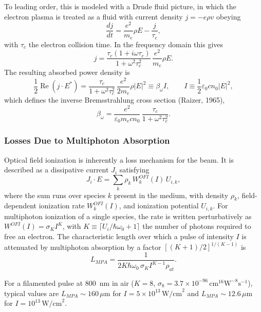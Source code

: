 \documentclass[11pt,a4paper]{article}
\begin{document}
To leading order, this is modeled with a Drude fluid picture, in which the electron plasma is treated as a fluid with current density $j=-e\rho v$ obeying
\begin{equation}
\frac{dj}{dt} = \frac{e^2}{m_e}\rho E - \frac{j}{\tau_c},
\end{equation}
with $\tau_c$ the electron collision time. In the frequency domain this gives
\begin{equation}
j = \frac{\tau_c(1+i\omega\tau_c)}{1+\omega^2\tau_c^2}\,\frac{e^2}{m_e}\rho E.
\end{equation}
The resulting absorbed power density is
\begin{equation}
\frac12\operatorname{Re}(j\cdot E^*) = \frac{\tau_c}{1+\omega^2\tau_c^2}\,\frac{e^2}{2m_e}\rho|E|^2 \equiv \beta_\omega I,
\qquad I\equiv\frac12\varepsilon_0cn_0|E|^2,
\end{equation}
which defines the inverse Bremsstrahlung cross section (Raizer, 1965),
\begin{equation}
\beta_\omega = \frac{e^2}{\varepsilon_0m_ecn_0}\,\frac{\tau_c}{1+\omega^2\tau_c^2}.
\end{equation}

\subsubsection{Losses Due to Multiphoton Absorption}
Optical field ionization is inherently a loss mechanism for the beam. It is described as a dissipative current $J_i$ satisfying
\begin{equation}
J_i\cdot E = \sum_k \rho_k\,W^{OFI}_k(I)\,U_{i,k},
\end{equation}
where the sum runs over species $k$ present in the medium, with density $\rho_k$, field-dependent ionization rate $W^{OFI}_k(I)$, and ionization potential $U_{i,k}$. For multiphoton ionization of a single species, the rate is written perturbatively as $W^{OFI}(I)=\sigma_KI^K$, with $K\equiv\lceil U_i/\hbar\omega_0+1\rceil$ the number of photons required to free an electron. The characteristic length over which a pulse of intensity $I$ is attenuated by multiphoton absorption by a factor $[(K+1)/2]^{1/(K-1)}$ is
\begin{equation}
L_{MPA} = \frac{1}{2K\hbar\omega_0\,\sigma_K I^{K-1}\rho_{at}}.
\end{equation}

For a filamented pulse at 800~nm in air ($K=8$, $\sigma_8=3.7\times10^{-96}\,\text{cm}^{16}\text{W}^{-8}\text{s}^{-1}$), typical values are $L_{MPA}\sim160\,\mu\text{m}$ for $I=5\times10^{13}\,\text{W/cm}^2$ and $L_{MPA}\sim12.6\,\mu\text{m}$ for $I=10^{13}\,\text{W/cm}^2$.
\end{document}
